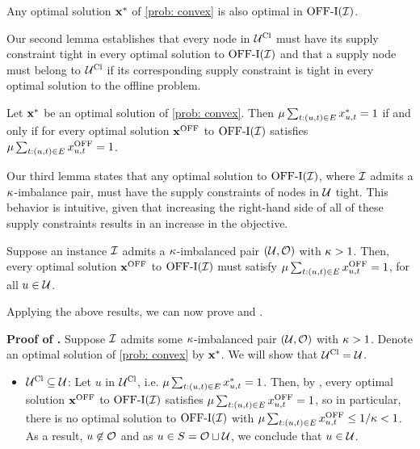 {\begin{lemma}
    \label{claim: PconvexOptSol}
    Any optimal solution $\mathbf{x}^*$ of \ref{prob: convex} is also optimal in $\mathrm{\mathrm{OFF}}\textrm{-}\mathrm{I}(\mathcal I)$.
\end{lemma}


{Our second lemma establishes that every node in $\mathcal U^{\mathrm{Cl}}$ must have its supply constraint tight in every optimal solution to $\mathrm{\mathrm{OFF}}\textrm{-}\mathrm{I}(\mathcal I)$ and that a supply node must belong to $\mathcal U^{\mathrm{Cl}}$ if its corresponding supply constraint is tight in every optimal solution to the offline problem.}

\begin{lemma}
    \label{claim: convexProb1}
    Let $\mathbf{x}^*$ be an optimal solution of \ref{prob: convex}. Then $\mu \sum_{t: (u, t) \in E} x^*_{u, t} = 1$ if and only if for every optimal solution $\mathbf{x}^{\mathrm{OFF}}$ to $\mathrm{\mathrm{OFF}}\textrm{-}\mathrm{I}(\mathcal I)$ satisfies $\mu \sum_{t: (u,t) \in E} x^{\mathrm{OFF}}_{u,t} = 1$.
\end{lemma}

{Our third} %
lemma states that any optimal solution to $\mathrm{\mathrm{OFF}}\textrm{-}\mathrm{I}(\mathcal I)$, where $\mathcal I$ admits a $\kappa$-imbalance pair, must have the supply constraints of nodes in $\mathcal U$ tight. This behavior is intuitive, {given that  increasing the right-hand side of all of these supply constraints results in an increase in the objective}. %

\begin{lemma}
    \label{lemma: kImbalancePairOffline}
    Suppose an instance $\mathcal I$ admits a $\kappa$-imbalanced pair $(\mathcal U, \mathcal O)$ with $\kappa > 1$. Then, every optimal solution $\mathbf{x}^{\mathrm{OFF}}$ to $\mathrm{\mathrm{OFF}}\textrm{-}\mathrm{I}(\mathcal I)$ must satisfy $\mu \sum_{t: (u,t) \in E} x^{\mathrm{OFF}}_{u,t} = 1$, for all $u \in \mathcal U$.
\end{lemma}

{Applying the above results, we can now prove}  and .

\noindent \textbf{Proof of .} Suppose $\mathcal I$ admits some $\kappa$-imbalanced pair $(\mathcal U, \mathcal O)$ with $\kappa > 1$. Denote an optimal solution of \ref{prob: convex} by $\mathbf{x}^*$. We will show that $\mathcal U^{\mathrm{Cl}} = \mathcal U$.
    \begin{itemize}
        \item $\mathcal U^{\mathrm{Cl}} \subseteq \mathcal U$: Let $u$ in $\mathcal U^{\mathrm{Cl}}$, i.e.  $\mu \sum_{t: (u,t) \in E} x^*_{u,t} = 1$. {Then, by , every optimal solution $\mathbf{x}^{\mathrm{OFF}}$ to $\mathrm{\mathrm{OFF}}\textrm{-}\mathrm{I}(\mathcal I)$ satisfies $\mu \sum_{t: (u,t) \in E} x^{\mathrm{OFF}}_{u,t} = 1$, so in particular, there is no optimal solution to $\mathrm{\mathrm{OFF}}\textrm{-}\mathrm{I}(\mathcal I)$ with $\mu \sum_{t: (u,t) \in E} x^{\mathrm{OFF}}_{u,t} \leq 1/\kappa<1$. As a result, $u \not \in \mathcal O$ and as $u\in S=\mathcal O\sqcup \mathcal U$, we conclude that $u \in \mathcal U$}.\\


\end{itemize}}
